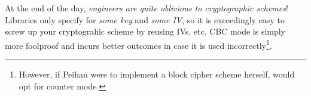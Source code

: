 At the end of the day, \emph{engineers are quite oblivious to cryptographic schemes}! Libraries only specify for \emph{some key} and \emph{some IV}, so it is exceedingly easy to screw up your cryptograhic scheme by reusing IVs, etc. CBC mode is simply more foolproof and incurs better outcomes in case it is used incorrectly\footnote{However, if Peihan were to implement a block cipher scheme herself, would opt for counter mode.}.